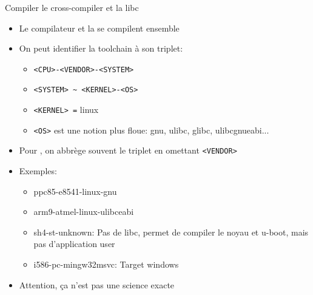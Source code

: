 \begin{frame}[fragile=singleslide]{Compiler le cross-compiler et la libc}
  \begin{itemize}
  \item Le compilateur et la  se compilent ensemble
  \item On peut identifier la toolchain à son triplet:
    \begin{itemize}
    \item \verb+<CPU>-<VENDOR>-<SYSTEM>+
    \item \verb+<SYSTEM> ~ <KERNEL>-<OS>+
    \item \verb+<KERNEL> =+ linux
    \item \verb+<OS>+  est une notion  plus floue: gnu,  ulibc, glibc,
      ulibcgnueabi...
    \end{itemize}
  \item  Pour ,  on abbrège  souvent le  triplet  en omettant
    \verb+<VENDOR>+
  \item Exemples:
    \begin{itemize}
    \item ppc85-e8541-linux-gnu %
    \item arm9-atmel-linux-ulibceabi %
    \item sh4-st-unknown: Pas de libc, permet de compiler le noyau
      et u-boot, mais pas d'application user
    \item i586-pc-mingw32msvc: Target windows
    \end{itemize}
  \item Attention, ça n'est pas une science exacte
  \end{itemize}
\end{frame}

